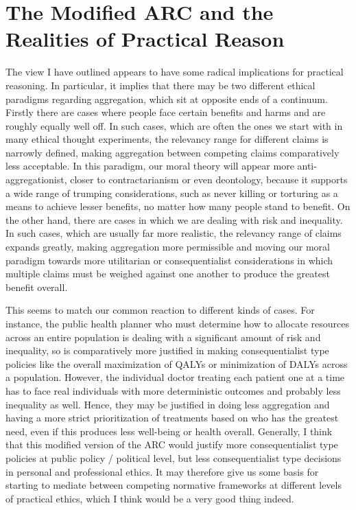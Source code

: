 \documentclass[man,11pt,a4paper]{apa7}
\begin{document}
\section{The Modified ARC and the Realities of Practical Reason}

The view I have outlined appears to have some radical implications for practical reasoning. In particular, it implies that there may be two different ethical paradigms regarding aggregation, which sit at opposite ends of a continuum. Firstly there are cases where people face certain benefits and harms and are roughly equally well off. In such cases, which are often the ones we start with in many ethical thought experiments, the relevancy range for different claims is narrowly defined, making aggregation between competing claims comparatively less acceptable. In this paradigm, our moral theory will appear more anti-aggregationist, closer to contractarianism or even deontology, because it supports a wide range of trumping considerations, such as never killing or torturing as a means to achieve lesser benefits, no matter how many people stand to benefit. On the other hand, there are cases in which we are dealing with risk and inequality. In such cases, which are usually far more realistic, the relevancy range of claims expands greatly, making aggregation more permissible and moving our moral paradigm towards more utilitarian or consequentialist considerations in which multiple claims must be weighed against one another to produce the greatest benefit overall.

This seems to match our common reaction to different kinds of cases. For instance, the public health planner who must determine how to allocate resources across an entire population is dealing with a significant amount of risk and inequality, so is comparatively more justified in making consequentialist type policies like the overall maximization of QALYs or minimization of DALYs across a population. However, the individual doctor treating each patient one at a time has to face real individuals with more deterministic outcomes and probably less inequality as well. Hence, they may be justified in doing less aggregation and having a more strict prioritization of treatments based on who has the greatest need, even if this produces less well-being or health overall. Generally, I think that this modified version of the ARC would justify more consequentialist type policies at public policy / political level, but less consequentialist type decisions in personal and professional ethics. It may therefore give us some basis for starting to mediate between competing normative frameworks at different levels of practical ethics, which I think would be a very good thing indeed.
\end{document}
